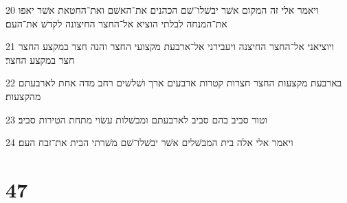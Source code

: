 \par 20 ויאמר אלי זה המקום אשׁר יבשׁלו־שׁם הכהנים את־האשׁם ואת־החטאת אשׁר יאפו את־המנחה לבלתי הוציא אל־החצר החיצונה לקדשׁ את־העם׃
\par 21 ויוציאני אל־החצר החיצנה ויעבירני אל־ארבעת מקצועי החצר והנה חצר במקצע החצר חצר במקצע החצר׃
\par 22 בארבעת מקצעות החצר חצרות קטרות ארבעים ארך ושׁלשׁים רחב מדה אחת לארבעתם מהקצעות׃
\par 23 וטור סביב בהם סביב לארבעתם ומבשׁלות עשׂוי מתחת הטירות סביב׃
\par 24 ויאמר אלי אלה בית המבשׁלים אשׁר יבשׁלו־שׁם משׁרתי הבית את־זבח העם׃

\chapter{47}

